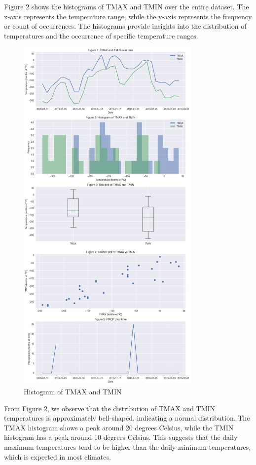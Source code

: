 \documentclass{article}
\begin{document}
Figure 2 shows the histograms of TMAX and TMIN over the entire dataset. The x-axis represents the temperature range, while the y-axis represents the frequency or count of occurrences. The histograms provide insights into the distribution of temperatures and the occurrence of specific temperature ranges.

\begin{figure}[h]
  \centering
  \includegraphics[width=0.8\textwidth]{figure_0.png}
  \caption{Histogram of TMAX and TMIN}
  \label{fig:histogram}
\end{figure}

From Figure 2, we observe that the distribution of TMAX and TMIN temperatures is approximately bell-shaped, indicating a normal distribution. The TMAX histogram shows a peak around 20 degrees Celsius, while the TMIN histogram has a peak around 10 degrees Celsius. This suggests that the daily maximum temperatures tend to be higher than the daily minimum temperatures, which is expected in most climates.
\end{document}
